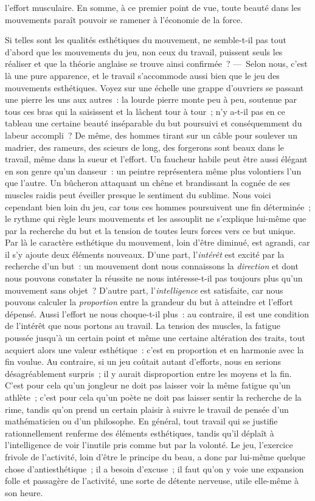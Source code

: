 \documentclass[french,twoside]{book} %
\begin{document}
l’effort musculaire. En somme, à ce premier point de vue, toute beauté  dans les mouvements paraît pouvoir se ramener à l’économie de la force.\par
Si telles sont les qualités esthétiques du mouvement, ne semble-t-il pas tout d’abord que les mouvements du jeu, non ceux du travail, puissent seuls les réaliser et que la théorie anglaise se trouve ainsi confirmée ? — Selon nous, c’est là une pure apparence, et le travail s’accommode aussi bien que le jeu des mouvements esthétiques. Voyez sur une échelle une grappe d’ouvriers se passant une pierre les uns aux autres : la lourde pierre monte peu à peu, soutenue par tous ces bras qui la saisissent et la lâchent tour à tour ; n’y a-t-il pas en ce tableau une certaine beauté inséparable du but poursuivi et conséquemment du labeur accompli ? De même, des hommes tirant sur un câble pour soulever un madrier, des rameurs, des scieurs de long, des forgerons sont beaux dans le travail, même dans la sueur et l’effort. Un faucheur habile peut être aussi élégant en son genre qu’un danseur : un peintre représentera même plus volontiers l’un que l’autre. Un bûcheron attaquant un chêne et brandissant la cognée de ses muscles raidis peut éveiller presque le sentiment du sublime. Nous voici cependant bien loin du jeu, car tous ces hommes poursuivent une fin déterminée ; le rythme qui règle leurs mouvements et les assouplit ne s’explique lui-même que par la recherche du but et la tension de toutes leurs forces vers ce but unique. Par là le caractère esthétique du mouvement, loin d’être diminué, est agrandi, car il s’y ajoute deux éléments nouveaux. D’une part, l’\emph{intérêt} est excité par la recherche d’un but : un mouvement dont nous connaissons la  \emph{direction} et dont nous pouvons constater la réussite ne nous intéresse-t-il pas toujours plus qu’un mouvement sans objet ? D’autre part, l’\emph{intelligence} est satisfaite, car nous pouvons calculer la \emph{proportion} entre la grandeur du but à atteindre et l’effort dépensé. Aussi l’effort ne nous choque-t-il plus : au contraire, il est une condition de l’intérêt que nous portons au travail. La tension des muscles, la fatigue poussée jusqu’à un certain point et même une certaine altération des traits, tout acquiert alors une valeur esthétique : c’est en proportion et en harmonie avec la fin voulue. Au contraire, si un jeu coûtait autant d’efforts, nous en serions désagréablement surpris ; il y aurait disproportion entre les moyens et la fin. C’est pour cela qu’un jongleur ne doit pas laisser voir la même fatigue qu’un athlète ; c’est pour cela qu’un poète ne doit pas laisser sentir la recherche de la rime, tandis qu’on prend un certain plaisir à suivre le travail de pensée d’un mathématicien ou d’un philosophe. En général, tout travail qui se justifie rationnellement renferme des éléments esthétiques, tandis qu’il déplaît à l’intelligence de voir l’inutile pris comme but par la volonté. Le jeu, l’exercice frivole de l’activité, loin d’être le principe du beau, a donc par lui-même quelque chose d’antiesthétique ; il a besoin d’excuse ; il faut qu’on y voie une expansion folle et passagère de l’activité, une sorte de détente nerveuse, utile elle-même à son heure.\par
\end{document}
